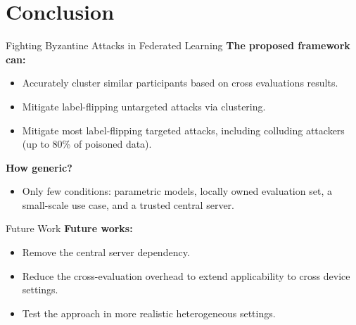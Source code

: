 \section*{Conclusion}

\begin{frame}
  \sectionpage
\end{frame}

\begin{frame}{Fighting Byzantine Attacks in Federated Learning}
  \textbf{The proposed framework can:}
  \begin{itemize}
    \item Accurately cluster similar participants based on cross evaluations results.
    \item Mitigate label-flipping untargeted attacks via clustering.
    \item Mitigate most label-flipping targeted attacks, including colluding attackers (up to 80\% of poisoned data).
  \end{itemize}

  \pause
  \textbf{How generic?}
  \begin{itemize}
    \item Only few conditions: parametric models, locally owned evaluation set, a \alert<3>{small-scale use case}, and a \alert<3>{trusted central server}.
  \end{itemize}
\end{frame}


\begin{frame}{Future Work}
  \textbf{Future works:}
    \begin{itemize}
      \item Remove the central server dependency.
      \item Reduce the cross-evaluation overhead to extend applicability to cross device settings.
      \item Test the approach in more realistic heterogeneous settings.
    \end{itemize}
\end{frame}


